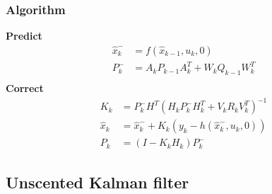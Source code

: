 \subsubsection{Algorithm}
\textbf{Predict}
\begin{equation}
\label{eq:ekf_predict}
\begin{split}
\hat{x}_k^- &= f(\hat{x}_{k-1},u_k,0)\\
P_k^- &= A_kP_{k-1}A_k^T + W_kQ_{k-1}W_k^T\\
\end{split}
\end{equation}
\textbf{Correct}\\
\begin{equation}
\label{eq:ekf_correct}
\begin{split}
K_k &= P_k^-H^T(H_kP_k^-H_k^T + V_kR_kV_k^T)^{-1}\\
\hat{x}_k &= \hat{x}_k^- + K_k(y_k-h(\hat{x}_k^-,u_k,0))\\
P_k &= (I- K_kH_k)P_k^-
\end{split}
\end{equation}
\subsection{Unscented Kalman filter}